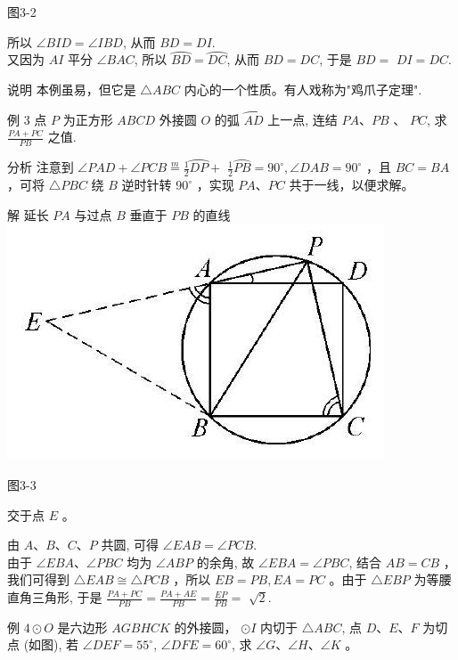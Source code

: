 \documentclass[10pt]{article}
\begin{document}
图3-2

所以 $\angle B I D=\angle I B D$, 从而 $B D=D I$.\\
又因为 $A I$ 平分 $\angle B A C$, 所以 $\overparen{B D}=\overparen{D C}$, 从而 $B D=D C$, 于是 $B D=$ $D I=D C$.

说明 本例虽易，但它是 $\triangle A B C$ 内心的一个性质。有人戏称为"鸡爪子定理".

例 3 点 $P$ 为正方形 $A B C D$ 外接圆 $O$ 的弧 $\overparen{A D}$ 上一点, 连结 $P A 、 P B$ 、 $P C$, 求 $\frac{P A+P C}{P B}$ 之值.

分析 注意到 $\angle P A D+\angle P C B \stackrel{m}{=} \frac{1}{2} \overparen{D P}+$ $\frac{1}{2} \overparen{P B}=90^{\circ}, \angle D A B=90^{\circ}$ ，且 $B C=B A$ ，可将 $\triangle P B C$ 绕 $B$ 逆时针转 $90^{\circ}$ ，实现 $P A 、 P C$ 共于一线，以便求解。

解 延长 $P A$ 与过点 $B$ 垂直于 $P B$ 的直线\\
\includegraphics[max width=\textwidth, center]{2024_10_30_66b8e5e701da2093c133g-023}

图3-3

交于点 $E$ 。

由 $A 、 B 、 C 、 P$ 共圆, 可得 $\angle E A B=\angle P C B$.\\
由于 $\angle E B A 、 \angle P B C$ 均为 $\angle A B P$ 的余角, 故 $\angle E B A=\angle P B C$, 结合 $A B=C B$ ，我们可得到 $\triangle E A B \cong \triangle P C B$ ，所以 $E B=P B, E A=P C$ 。由于 $\triangle E B P$ 为等腰直角三角形, 于是 $\frac{P A+P C}{P B}=\frac{P A+A E}{P B}=\frac{E P}{P B}=$ $\sqrt{2}$.

例 $4 \odot O$ 是六边形 $A G B H C K$ 的外接圆， $\odot I$ 内切于 $\triangle A B C$, 点 $D 、 E 、 F$ 为切点 (如图), 若 $\angle D E F=55^{\circ}$, $\angle D F E=60^{\circ}$, 求 $\angle G 、 \angle H 、 \angle K$ 。
\end{document}
